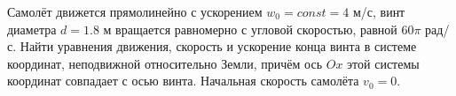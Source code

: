 Самолёт движется прямолинейно с ускорением $w_0 = const = 4$ м/с,
винт диаметра $d = 1.8$ м вращается равномерно с угловой скоростью,
равной $60\pi$ рад/с.
Найти уравнения движения, скорость и ускорение конца винта в системе координат,
неподвижной относительно Земли, причём ось $Ox$ этой системы координат
совпадает с осью винта.
Начальная скорость самолёта $v_0 = 0$.
